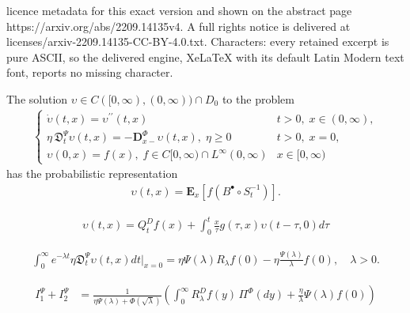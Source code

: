 \documentclass[10pt,a4paper]{amsart}
\begin{document}
licence metadata for this exact version and shown on the abstract page https://arxiv.org/abs/2209.14135v4. A full rights notice is delivered at licenses/arxiv-2209.14135-CC-BY-4.0.txt. Characters: every retained excerpt is pure ASCII, so the delivered engine, XeLaTeX with its default Latin Modern text font, reports no missing character.
	\begin{theorem}
		\label{fracdyntm}
		The solution $\upsilon \in C([0,\infty),(0,\infty)) \cap D_0$ to the problem
		\begin{align*}
			\begin{cases}
				\displaystyle 	\dot{\upsilon}(t,x)= \upsilon^{\prime \prime}(t,x) & t>0,\; x \in (0,\infty),\\
				\displaystyle 	\eta\, \mathfrak{D}_t^\Psi \upsilon(t,x) = -\mathbf{D}_{x-}^\Phi \upsilon(t,x), \; \eta \geq 0    & t>0,\; x=0,\\
				\displaystyle 	\upsilon(0,x)=f(x), \; f \in C[0,\infty) \cap L^\infty(0, \infty)  &x\in [0, \infty)
			\end{cases}
		\end{align*}
		has the probabilistic representation
		\begin{align}
			\label{NLstickyBpallino}
			\upsilon(t,x)=\mathbf{E}_x\left[f(B^\bullet \circ S_t^{-1})\right].
		\end{align}
	\end{theorem}

		\begin{align}
			\label{upsilonSol}
			\upsilon(t,x)=Q_t^D f(x)+\int_0^t \frac{x}{\tau} g(\tau,x) \upsilon(t-\tau,0) d\tau
		\end{align}

		\begin{align}
			\label{timeBondCond}
			\int_0^\infty e^{-\lambda t} \eta\mathfrak{D}_t^\Psi \upsilon(t,x) dt \bigg\vert_{x=0}= \eta \Psi(\lambda) R_\lambda f(0) - \eta \frac{\Psi(\lambda)}{\lambda} f(0), \quad \lambda>0.
		\end{align}

		\begin{align}
			I_1^\Psi+I_2^\Psi
			&=\frac{1}{\eta \Psi(\lambda) +\Phi(\sqrt \lambda)} \left( \int_0^\infty R_\lambda^D f(y) \, \Pi^\Phi(dy) + \frac{\eta}{\lambda} \Psi(\lambda)f(0) \right)
			\label{I1piuI2}
		\end{align}
\end{document}
